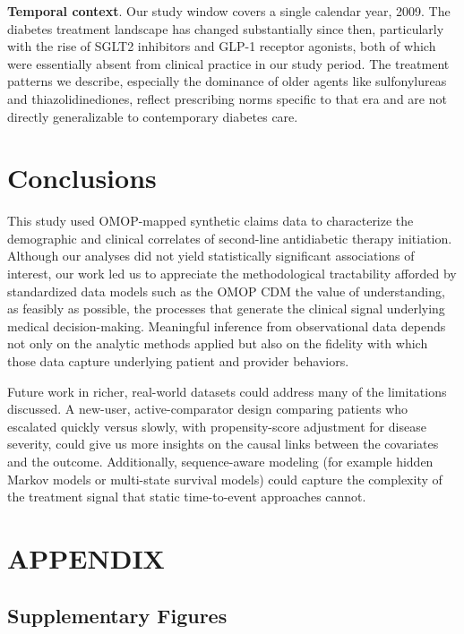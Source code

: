 \documentclass[twoside,11pt]{article}
\newcommand*\circled[1]{\tikz[baseline=(char.base)]{\node[shape=circle,draw,inner sep=1pt] (char) {#1};}}
\begin{document}
\textbf{Temporal context}. Our study window covers a single calendar year, 2009. The diabetes treatment landscape has changed substantially since then, particularly with the rise of SGLT2 inhibitors and GLP-1 receptor agonists, both of which were essentially absent from clinical practice in our study period. The treatment patterns we describe, especially the dominance of older agents like sulfonylureas and thiazolidinediones, reflect prescribing norms specific to that era and are not directly generalizable to contemporary diabetes care.

\section*{Conclusions}

This study used OMOP-mapped synthetic claims data to characterize the demographic and clinical correlates of second-line antidiabetic therapy initiation. Although our analyses did not yield statistically significant associations of interest, our work led us to \circled{1} appreciate the methodological tractability afforded by standardized data models such as the OMOP CDM \circled{2} the value of understanding, as feasibly as possible, the processes that generate the clinical signal underlying medical decision-making. Meaningful inference from observational data depends not only on the analytic methods applied but also on the fidelity with which those data capture underlying patient and provider behaviors.

Future work in richer, real-world datasets could address many of the limitations discussed. A new-user, active-comparator design comparing patients who escalated quickly versus slowly, with propensity-score adjustment for disease severity, could give us more insights on the causal links between the covariates and the outcome. Additionally, sequence-aware modeling (for example hidden Markov models or multi-state survival models) could capture the complexity of the treatment signal that static time-to-event approaches cannot.



\newpage
\section*{APPENDIX}

\subsection*{Supplementary Figures}
\end{document}
